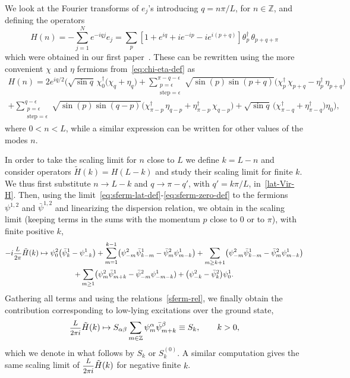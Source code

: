 \documentclass[11pt]{article}
\newcommand{\ffrac}[2]{\mbox{\footnotesize$\displaystyle\frac{#1}{#2}$}}
\newcommand{\ferm}{\theta}
\newcommand{\fermd}{\theta^{\dagger}}
\newcommand{\sferm}{\psi}
\newcommand{\bsferm}{\bar{\psi}}
\newcommand{\sfermp}{\psi^{2}}
\newcommand{\sfermm}{\psi^{1}}
\newcommand{\bsfermp}{\bar{\psi}^{2}}
\newcommand{\bsfermm}{\bar{\psi}^{1}}
\newcommand{\oZ}{\mathbb{Z}}
\newcommand{\step}{\epsilon}
\newcommand{\first}{first }
\newcommand{\enrg}{S}
\theoremstyle{definition}
\begin{document}
 We look  at  the Fourier transforms of $e_j$'s introducing $q=n\pi/L$, for $n\in\oZ$, and defining the operators
%
\begin{equation}\label{inter}
H(n) = -\sum_{j=1}^N e^{-iqj} e_j=\sum_{p}
\left[1+e^{iq}+ie^{-ip}-ie^{i(p+q)}\right] \fermd_{p}\,
\ferm_{p+q+\pi}
\end{equation}
%
which were obtained  in our \first paper~\cite{GRS1}. These  can be rewritten using the more convenient $\chi$ and $\eta$ fermions from~\eqref{eq:chi-eta-def} as
\begin{multline}\label{lat-Vir-H}
H(n) =
2e^{iq/2}\Biggl(\sqrt{\sin{q}}\, \chi^{\dagger}_{0}\bigl(\chi_{q} +
\eta_{q}\bigr) + \sum_{\substack{p=\step\\\text{step}=\step}}^{\pi-q-\step}
\sqrt{\sin{(p)}\sin{(p+q)}} \bigl(\chi^{\dagger}_{p}\,\chi_{p+q} -
\eta^{\dagger}_{p}\,\eta_{p+q}\bigr)\\
+ \sum_{\substack{p=\step\\\text{step}=\step}}^{q-\step}
\sqrt{\sin{(p)}\sin{(q-p)}}\bigl(\chi^{\dagger}_{\pi-p}\,\eta_{q-p} +
\eta^{\dagger}_{\pi-p}\,\chi_{q-p}\bigr)
+ \sqrt{\sin{q}}\, \bigl(\chi^{\dagger}_{\pi-q} +
\eta^{\dagger}_{\pi-q}\bigr)\eta_{0}\Biggr),
\end{multline}
where  $0<n<L$, while a similar expression can be written for other values of the modes $n$.


In order to take the scaling limit for $n$ close to $L$ we define $k=L-n$ and consider operators $\tilde{H}(k)=H(L-k)$ and study their scaling limit for finite $k$. We thus first substitute $n\to L-k$ and $q\to \pi-q'$, with $q'=k\pi/L$, in~\eqref{lat-Vir-H}. Then,
using the limit~\eqref{eq:sferm-lat-def}-\eqref{eq:sferm-zero-def} to the fermions
$\sferm^{1,2}$ and $\bsferm^{1,2}$ and linearizing the dispersion relation, we obtain in
the scaling limit (keeping terms in the sums with  the momentum $p$ close to $0$ or to $\pi$), with finite positive
$k$,
\begin{multline*}
-i\ffrac{L}{2\pi}\tilde{H}(k)\mapsto\sfermp_{0}\bigl(\bsfermm_{k} - \sfermm_{-k}\bigr)
+ \sum_{m=1}^{k-1}\bigl(\sfermp_{-m}\bsfermm_{k-m} -
\bsfermp_{m}\sfermm_{m-k}\bigr)
+ \sum_{m\geq k+1}\bigl(\sfermp_{-m}\bsfermm_{k-m} -
\bsfermp_{m}\sfermm_{m-k}\bigr)\\
+ \sum_{m\geq1}\bigl(\sfermp_{m}\bsfermm_{m+k} -
\bsfermp_{-m}\sfermm_{-m-k})
+ \bigl(\sfermp_{-k}-\bsfermp_{k}\bigr)\sfermm_{0}.
\end{multline*}
Gathering all terms and using the relations~\eqref{sferm-rel}, we finally obtain the contribution corresponding to low-lying
excitations over the ground state,
%
\begin{equation*}
\ffrac{L}{2\pi i}\tilde{H}(k) \mapsto  S_{\alpha \beta}\sum_{m\in\oZ}\sferm^{\alpha}_{m}\bsferm^{\beta}_{m+k}  \equiv
\enrg_k,\qquad k>0,
\end{equation*}
which we denote in what follows by $\enrg_k$ or   $\enrg^{(0)}_k$. A similar computation gives the same scaling limit of $\ffrac{L}{2\pi i}\tilde{H}(k)$ for negative finite $k$.
\end{document}
